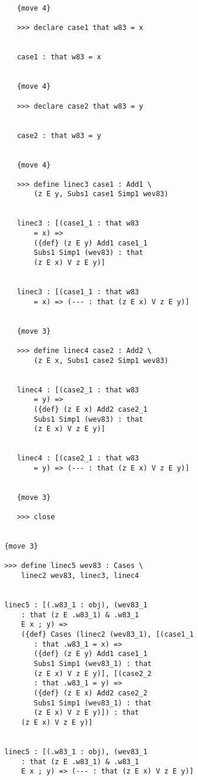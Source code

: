 \documentclass[12pt]{article}
\begin{document}
\begin{verbatim}
            {move 4}

            >>> declare case1 that w83 = x


            case1 : that w83 = x


            {move 4}

            >>> declare case2 that w83 = y


            case2 : that w83 = y


            {move 4}

            >>> define linec3 case1 : Add1 \
                (z E y, Subs1 case1 Simp1 wev83)


            linec3 : [(case1_1 : that w83 
                = x) => 
                ({def} (z E y) Add1 case1_1 
                Subs1 Simp1 (wev83) : that 
                (z E x) V z E y)]


            linec3 : [(case1_1 : that w83 
                = x) => (--- : that (z E x) V z E y)]


            {move 3}

            >>> define linec4 case2 : Add2 \
                (z E x, Subs1 case2 Simp1 wev83)


            linec4 : [(case2_1 : that w83 
                = y) => 
                ({def} (z E x) Add2 case2_1 
                Subs1 Simp1 (wev83) : that 
                (z E x) V z E y)]


            linec4 : [(case2_1 : that w83 
                = y) => (--- : that (z E x) V z E y)]


            {move 3}

            >>> close


         {move 3}

         >>> define linec5 wev83 : Cases \
             linec2 wev83, linec3, linec4


         linec5 : [(.w83_1 : obj), (wev83_1 
             : that (z E .w83_1) & .w83_1 
             E x ; y) => 
             ({def} Cases (linec2 (wev83_1), [(case1_1 
                : that .w83_1 = x) => 
                ({def} (z E y) Add1 case1_1 
                Subs1 Simp1 (wev83_1) : that 
                (z E x) V z E y)], [(case2_2 
                : that .w83_1 = y) => 
                ({def} (z E x) Add2 case2_2 
                Subs1 Simp1 (wev83_1) : that 
                (z E x) V z E y)]) : that 
             (z E x) V z E y)]


         linec5 : [(.w83_1 : obj), (wev83_1 
             : that (z E .w83_1) & .w83_1 
             E x ; y) => (--- : that (z E x) V z E y)]



\end{verbatim}
\end{document}

